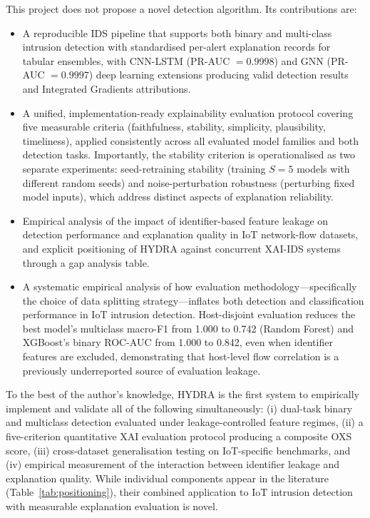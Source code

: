 \documentclass[12pt,a4paper]{report}
\begin{document}
This project does not propose a novel detection algorithm. Its contributions are:
\begin{itemize}
  \item A reproducible IDS pipeline that supports both binary and multi-class intrusion detection with standardised per-alert explanation records for tabular ensembles, with CNN-LSTM (PR-AUC $= 0.9998$) and GNN (PR-AUC $= 0.9997$) deep learning extensions producing valid detection results and Integrated Gradients attributions.
  \item A unified, implementation-ready explainability evaluation protocol covering five measurable criteria (faithfulness, stability, simplicity, plausibility, timeliness), applied consistently across all evaluated model families and both detection tasks. Importantly, the stability criterion is operationalised as two separate experiments: seed-retraining stability (training $S = 5$ models with different random seeds) and noise-perturbation robustness (perturbing fixed model inputs), which address distinct aspects of explanation reliability.
  \item Empirical analysis of the impact of identifier-based feature leakage on detection performance and explanation quality in IoT network-flow datasets, and explicit positioning of HYDRA against concurrent XAI-IDS systems through a gap analysis table.
  \item A systematic empirical analysis of how evaluation methodology---specifically the choice of data splitting strategy---inflates both detection and classification performance in IoT intrusion detection. Host-disjoint evaluation reduces the best model's multiclass macro-F1 from 1.000 to 0.742 (Random Forest) and XGBoost's binary ROC-AUC from 1.000 to 0.842, even when identifier features are excluded, demonstrating that host-level flow correlation is a previously underreported source of evaluation leakage.
\end{itemize}

To the best of the author's knowledge, HYDRA is the first system to empirically implement and validate all of the following simultaneously: (i) dual-task binary and multiclass detection evaluated under leakage-controlled feature regimes, (ii) a five-criterion quantitative XAI evaluation protocol producing a composite OXS score, (iii) cross-dataset generalisation testing on IoT-specific benchmarks, and (iv) empirical measurement of the interaction between identifier leakage and explanation quality. While individual components appear in the literature (Table~\ref{tab:positioning}), their combined application to IoT intrusion detection with measurable explanation evaluation is novel.
\end{document}
